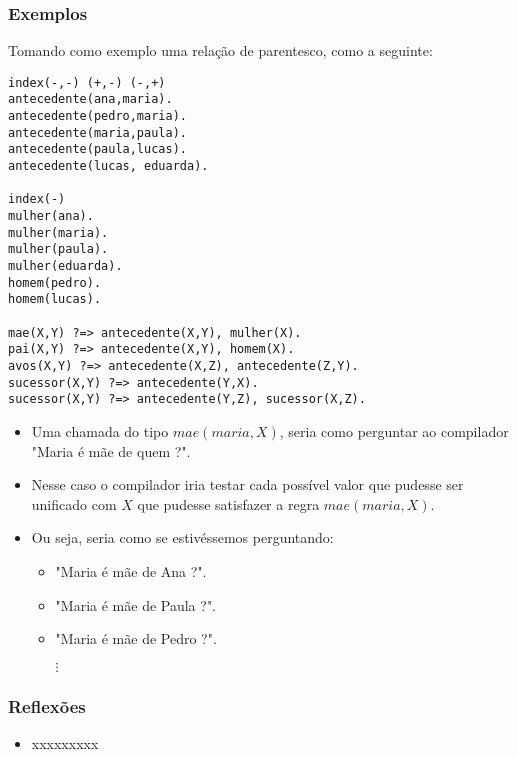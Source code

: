 \begin{frame}[fragile]

\frametitle{Exemplos}
    
Tomando como exemplo uma relação de parentesco, como a seguinte:
        \begin{lstlisting}[frame=single]
index(-,-) (+,-) (-,+)
antecedente(ana,maria).
antecedente(pedro,maria).
antecedente(maria,paula).
antecedente(paula,lucas).
antecedente(lucas, eduarda).

index(-)
mulher(ana).
mulher(maria).
mulher(paula).
mulher(eduarda).
homem(pedro).
homem(lucas).

mae(X,Y) ?=> antecedente(X,Y), mulher(X).
pai(X,Y) ?=> antecedente(X,Y), homem(X).
avos(X,Y) ?=> antecedente(X,Z), antecedente(Z,Y).
sucessor(X,Y) ?=> antecedente(Y,X).
sucessor(X,Y) ?=> antecedente(Y,Z), sucessor(X,Z).
        \end{lstlisting}
    
\end{frame}




\begin{frame}[fragile]{}
    
    \begin{itemize}
        \item Uma chamada do tipo $mae(maria, X)$, seria como perguntar ao compilador
        "Maria é mãe de quem ?".
        
        \item Nesse caso o compilador iria testar cada possível valor que pudesse ser 
        unificado com $X$ que pudesse satisfazer a regra $mae(maria,X)$.
        
        \item Ou seja, seria como se estivéssemos perguntando:
        
        \begin{itemize}
            \item "Maria é mãe de Ana ?".
            
            \item "Maria é mãe de Paula ?".
            
            \item "Maria é mãe de Pedro ?".
            
            $\vdots$
        \end{itemize}
        
    \end{itemize}
    
\end{frame}




\begin{frame}[fragile]
\frametitle{Reflexões}


\begin{itemize}
\item xxxxxxxxx  
\end{itemize}

\end{frame}
